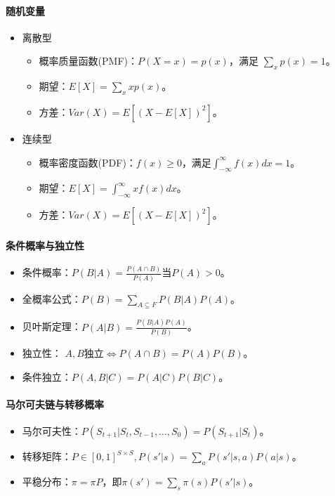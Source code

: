 \documentclass[
12pt, %
a4paper, 
oneside, %
headinclude,footinclude, %
]{scrartcl}
\begin{document}
\paragraph*{随机变量}
\begin{itemize}
\item 离散型
\begin{itemize}
\item 概率质量函数(PMF)：$ P(X = x) = p(x) $，满足 $ \sum_{x} p(x) = 1 $。
\item 期望：$ E[X] = \sum_{x} x p(x) $。
\item 方差：$ Var(X) = E[(X - E[X])^2] $。
\end{itemize}
\item 连续型
\begin{itemize}
\item 概率密度函数(PDF)：$ f(x) \geq 0 $，满足$ \int_{-\infty}^{\infty} f(x) dx = 1 $。
\item 期望：$ E[X] = \int_{-\infty}^{\infty} x f(x) dx $。
\item 方差：$ Var(X) = E[(X - E[X])^2] $。
\end{itemize}
\end{itemize}
\paragraph*{条件概率与独立性}
\begin{itemize}
\item 条件概率：$ P(B|A) = \frac{P(A \cap B)}{P(A)}$当$ P(A) > 0 $。
\item 全概率公式：$ P(B) = \sum_{A \subseteq F} P(B|A) P(A) $。
\item 贝叶斯定理：$ P(A|B) = \frac{P(B|A) P(A)}{P(B)} $。
\item 独立性： $ A,B $独立$ \iff P(A \cap B) = P(A)P(B) $。
\item 条件独立：$ P(A ,B|C) = P(A|C)P(B|C) $。
\end{itemize}
\paragraph*{马尔可夫链与转移概率}
\begin{itemize}
\item 马尔可夫性：$ P(S_{t + 1}|S_t, S_{t - 1}, \dots, S_0) = P(S_{t + 1}|S_t) $。
\item 转移矩阵：$ P \in [0, 1]^{S \times S}, P(s'|s) = \sum_{a} P(s'|s, a) P(a|s) $。
\item 平稳分布：$ \pi = \pi P $，即$ \pi(s') = \sum_{s} \pi(s) P(s'|s) $。
\end{itemize}
\end{document}
